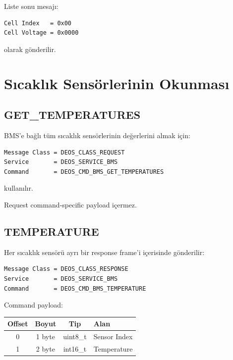 \documentclass[a4paper,10pt]{article}
\begin{document}
Liste sonu mesajı:

\begin{lstlisting}
Cell Index   = 0x00
Cell Voltage = 0x0000
\end{lstlisting}

olarak gönderilir.

\section{Sıcaklık Sensörlerinin Okunması}

\subsection{GET\_TEMPERATURES}

BMS'e bağlı tüm sıcaklık sensörlerinin değerlerini almak için:

\begin{lstlisting}
Message Class = DEOS_CLASS_REQUEST
Service       = DEOS_SERVICE_BMS
Command       = DEOS_CMD_BMS_GET_TEMPERATURES
\end{lstlisting}

kullanılır.

Request command-specific payload içermez.

\subsection{TEMPERATURE}

Her sıcaklık sensörü ayrı bir response frame'i içerisinde gönderilir:

\begin{lstlisting}
Message Class = DEOS_CLASS_RESPONSE
Service       = DEOS_SERVICE_BMS
Command       = DEOS_CMD_BMS_TEMPERATURE
\end{lstlisting}

Command payload:

\begin{center}
\begin{tabular}{c c c l}
\toprule
\textbf{Offset} &
\textbf{Boyut} &
\textbf{Tip} &
\textbf{Alan} \\
\midrule

0 & 1 byte & uint8\_t & Sensor Index \\
1 & 2 byte & int16\_t & Temperature \\

\bottomrule
\end{tabular}
\end{center}
\end{document}

